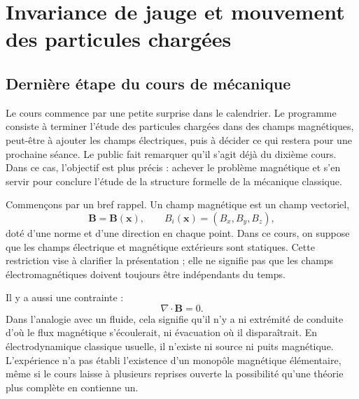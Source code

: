 \chapter{Invariance de jauge et mouvement des particules chargées}


\section{Dernière étape du cours de mécanique}

Le cours commence par une petite surprise dans le calendrier. Le programme consiste à terminer l’étude des particules chargées dans des champs magnétiques, peut-être à ajouter les champs électriques, puis à décider ce qui restera pour une prochaine séance. Le public fait remarquer qu’il s’agit déjà du dixième cours. Dans ce cas, l’objectif est plus précis : achever le problème magnétique et s’en servir pour conclure l’étude de la structure formelle de la mécanique classique.

Commençons par un bref rappel. Un champ magnétique est un champ vectoriel,
\begin{equation}
  \mathbf B=\mathbf B(\mathbf x),
  \qquad
  B_i(\mathbf x)=(B_x,B_y,B_z),
\end{equation}
doté d’une norme et d’une direction en chaque point. Dans ce cours, on suppose que les champs électrique et magnétique extérieurs sont statiques. Cette restriction vise à clarifier la présentation ; elle ne signifie pas que les champs électromagnétiques doivent toujours être indépendants du temps.

Il y a aussi une contrainte :
\begin{equation}
  \nabla\cdot\mathbf B=0.
\end{equation}
Dans l’analogie avec un fluide, cela signifie qu’il n’y a ni extrémité de conduite d’où le flux magnétique s’écoulerait, ni évacuation où il disparaîtrait. En électrodynamique classique usuelle, il n’existe ni source ni puits magnétique. L’expérience n’a pas établi l’existence d’un monopôle magnétique élémentaire, même si le cours laisse à plusieurs reprises ouverte la possibilité qu’une théorie plus complète en contienne un.

